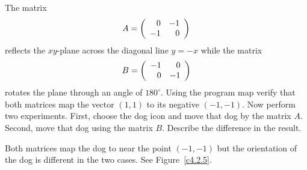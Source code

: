 \documentclass{ximera}
\begin{document}
\begin{computerExercise}  \label{c4.2.5}
The matrix 
\[
A = \left(\begin{array}{rr} 0 & -1\\ -1 &0\end{array}\right)
\]
reflects the $xy$-plane across the diagonal line $y=-x$ while the matrix
\[
B=\left(\begin{array}{rr} -1 & 0\\ 0 &-1\end{array}\right)
\]
rotates the plane through an angle of $180^\circ$. Using the program 
{\sf map} verify that both matrices map the vector $(1,1)$ to its negative
$(-1,-1)$.  Now perform two experiments.  First, choose the {\sf dog} icon 
and move that dog by the matrix $A$.  Second, move that dog using the 
matrix $B$.  Describe the difference in the result.

\begin{solution}
Both matrices map the dog to near the point $(-1,-1)$ but the
orientation of the dog is different in the two cases.  See 
Figure~\ref{c4.2.5}.
\begin{figure}[htb]
     \centerline{%
     \hspace*{-0.6in}
     }
\end{figure} 
\end{solution}
\end{computerExercise}   
\end{document}
